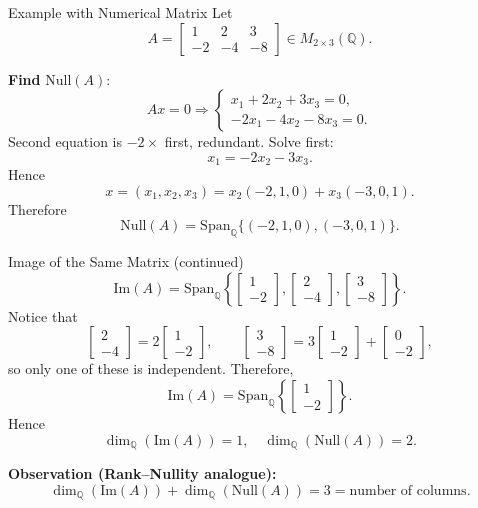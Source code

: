 \documentclass[11pt,aspectratio=43,ignorenonframetext,t]{beamer}
\begin{document}
\begin{frame}{Example with Numerical Matrix}
Let
\[
A=
\begin{bmatrix}
1 & 2 & 3\\
-2 & -4 & -8
\end{bmatrix}\in M_{2\times 3}(\mathbb{Q}).
\]

\textbf{Find } $\mathrm{Null}(A)$:
\[
A x = 0 \Rightarrow
\begin{cases}
x_1+2x_2+3x_3=0,\\
-2x_1-4x_2-8x_3=0.
\end{cases}
\]
Second equation is $-2\times$ first, redundant.  
Solve first:
\[
x_1=-2x_2-3x_3.
\]
Hence
\[
x=(x_1,x_2,x_3)=x_2(-2,1,0)+x_3(-3,0,1).
\]
Therefore
\[
\mathrm{Null}(A)=\mathrm{Span}_{\mathbb{Q}}\{(-2,1,0),(-3,0,1)\}.
\]
\end{frame}

\begin{frame}{Image of the Same Matrix (continued)}
\[
\mathrm{Im}(A)=\mathrm{Span}_{\mathbb{Q}}
\left\{
\begin{bmatrix}1\\-2\end{bmatrix},
\begin{bmatrix}2\\-4\end{bmatrix},
\begin{bmatrix}3\\-8\end{bmatrix}
\right\}.
\]
Notice that
\[
\begin{bmatrix}2\\-4\end{bmatrix}=2\begin{bmatrix}1\\-2\end{bmatrix}, \qquad
\begin{bmatrix}3\\-8\end{bmatrix}=3\begin{bmatrix}1\\-2\end{bmatrix}
+\begin{bmatrix}0\\-2\end{bmatrix},
\]
so only one of these is independent.  
Therefore,
\[
\mathrm{Im}(A)=\mathrm{Span}_{\mathbb{Q}}
\left\{
\begin{bmatrix}1\\-2\end{bmatrix}
\right\}.
\]
Hence
\[
\dim_{\mathbb{Q}}(\mathrm{Im}(A))=1,\quad
\dim_{\mathbb{Q}}(\mathrm{Null}(A))=2.
\]

\textbf{Observation (Rank–Nullity analogue):}
\[
\dim_{\mathbb{Q}}(\mathrm{Im}(A))+\dim_{\mathbb{Q}}(\mathrm{Null}(A))=3=\text{number of columns}.
\]
\end{frame}
\end{document}
